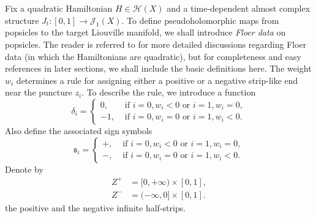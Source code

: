 \documentclass[11pt]{amsproc}
\def\d{\delta}
\def\sk{\mathfrak{s}}
\theoremstyle{remark}
\numberwithin{equation}{section}
\begin{document}
Fix a quadratic Hamiltonian $H \in \mathcal{H}(X)$ and a time-dependent almost complex structure $J_{t}: [0, 1] \to \mathcal{J}_{1}(X)$.
To define pseudoholomorphic maps from popsicles to the target Liouville manifold,
we shall introduce {\it Floer data} on popsicles.
The reader is referred to \cites{abouzaid_gc, ganatra, GGV} for more detailed discussions regarding Floer data (in which the Hamiltonians are quadratic),
but for completeness and easy references in later sections, 
we shall include the basic definitions here.
The weight $w_{i}$ determines a rule for assigning either a positive or a negative strip-like end near the puncture $z_{i}$. 
To describe the rule, we introduce a function
\begin{equation}\label{sign function}
\d_{i} = 
\begin{cases}
0, &\text{ if } i =  0, w_{i} < 0 \text{ or } i = 1, w_{i} = 0, \\
-1, &\text{ if } i = 0, w_{i} = 0 \text{ or } i = 1, w_{i} < 0.
\end{cases}
\end{equation}
Also define the associated sign symbols
\begin{equation}\label{sign symbol}
\sk_{i}= 
\begin{cases}
+, &\text{ if } i =  0, w_{i} < 0 \text{ or } i = 1, w_{i} = 0, \\
-, &\text{ if } i = 0, w_{i} = 0 \text{ or } i = 1, w_{i} < 0.
\end{cases}
\end{equation}
Denote by
\begin{align}
Z^{+} & = [0, +\infty) \times [0, 1], \\
Z^{-} & = (-\infty, 0] \times [0, 1].
\end{align}
the positive and the negative infinite half-strips.
\end{document}
